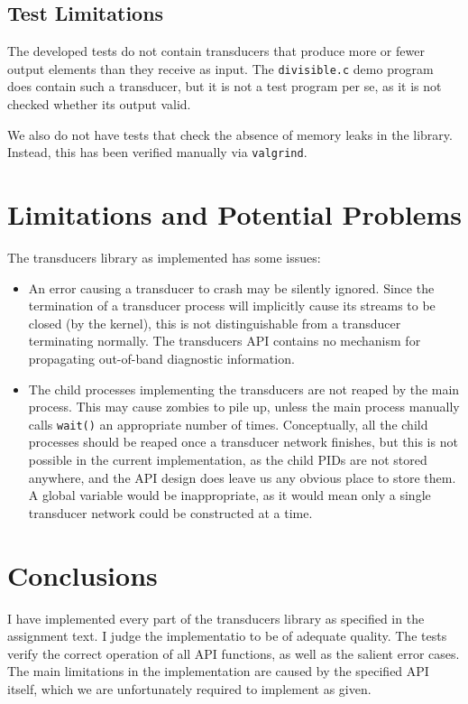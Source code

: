 \documentclass{article}
\begin{document}
\subsection{Test Limitations}

The developed tests do not contain transducers that produce more or
fewer output elements than they receive as input.  The
\texttt{divisible.c} demo program does contain such a transducer, but
it is not a test program per se, as it is not checked whether its
output valid.

We also do not have tests that check the absence of memory leaks in
the library.  Instead, this has been verified manually via
\texttt{valgrind}.

\section{Limitations and Potential Problems}
\label{sec:limitations}

The transducers library as implemented has some issues:

\begin{itemize}
\item An error causing a transducer to crash may be silently ignored.
  Since the termination of a transducer process will implicitly cause
  its streams to be closed (by the kernel), this is not
  distinguishable from a transducer terminating normally.  The
  transducers API contains no mechanism for propagating out-of-band
  diagnostic information.
\item The child processes implementing the transducers are not reaped
  by the main process.  This may cause zombies to pile up, unless the
  main process manually calls \texttt{wait()} an appropriate number of
  times.  Conceptually, all the child processes should be reaped once
  a transducer network finishes, but this is not possible in the
  current implementation, as the child PIDs are not stored anywhere,
  and the API design does leave us any obvious place to store them.  A
  global variable would be inappropriate, as it would mean only a
  single transducer network could be constructed at a time.
\end{itemize}

\section{Conclusions}

I have implemented every part of the transducers library as specified
in the assignment text.  I judge the implementatio to be of adequate
quality.  The tests verify the correct operation of all API functions,
as well as the salient error cases.  The main limitations in the
implementation are caused by the specified API itself, which we are
unfortunately required to implement as given.
\end{document}
